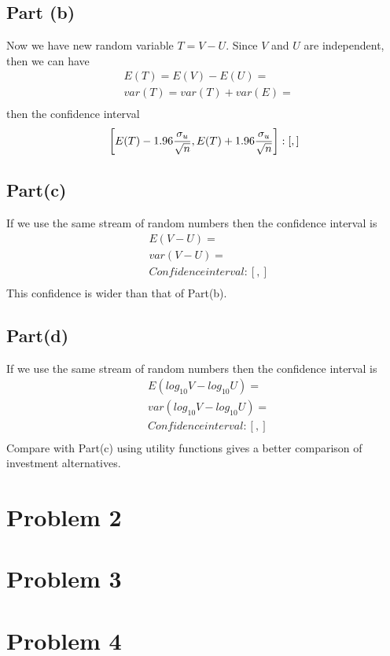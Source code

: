 \documentclass{report}
\begin{document}
\subsection*{Part (b)}
Now we have new random variable $ T=V-U $.  Since $V$ and $U$ are independent, then we can have
\begin{align*}
& E(T) = E(V)-E(U) =  \\
& var(T) = var(T)+var(E) = \\
\end{align*}
then the confidence interval  
$$\left[E(T)-1.96\frac{\sigma_u}{\sqrt{n}}, E(T)+1.96\frac{\sigma_u}{\sqrt{n}}\right]  :   [   ,  ]\\ $$
 
\subsection*{Part(c)} 
If we use the same stream of random numbers then the confidence interval is
\begin{align*}
& E(V-U) = \\
& var(V-U) = \\
& Confidence interval :  [ , ] \\
\end{align*}
This confidence is wider than that of Part(b). 

\subsection*{Part(d)} 
If we use the same stream of random numbers then the confidence interval is
\begin{align*}
& E(log_{10}V-log_{10}U) = \\
& var(log_{10}V-log_{10}U) = \\
& Confidence interval :  [ , ] \\
\end{align*}
Compare with Part(c) using utility functions gives a better comparison of investment alternatives.
 
\section*{Problem 2}


\section*{Problem 3}

\section*{Problem 4} 
\end{document}
